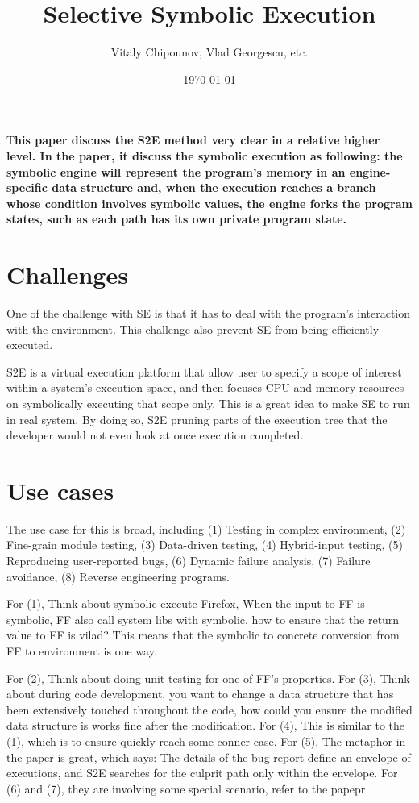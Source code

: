 \documentclass[	DIV=calc, paper=letter, fontsize=11pt,twocolumn]{scrartcl} %
\title{Selective Symbolic Execution}	%
\author{Vitaly Chipounov, Vlad Georgescu, etc. } %
\date{\today}
\newcommand{\initial}[1]{%
     \lettrine[lines=3,lhang=0.2,nindent=0em]{
     				\color{DarkGoldenrod}
     				{\textsf{#1}}}{}}
\begin{document}
\maketitle
\thispagestyle{fancy} 			%
\initial{T}\textbf{his paper discuss the S2E method very clear in a relative higher
level. In the paper, it discuss the symbolic execution as following: the
symbolic engine will represent the program’s memory in an engine-specific data
structure and, when the execution reaches a branch whose condition involves
symbolic values, the engine forks the program states, such as each path has
its own private program state.}

\section*{Challenges}

One of the challenge with SE is that it has to deal with the program’s
interaction with the environment. This challenge also prevent SE from being
efficiently executed.

S2E is a virtual execution platform that allow user to specify a scope of
interest within a system’s execution space, and then focuses CPU and memory
resources on symbolically executing that scope only. This is a great idea to
make SE to run in real system. By doing so, S2E pruning parts of the execution
tree that the developer would not even look at once execution completed.

\section*{Use cases}

The use case for this is broad, including (1) Testing in complex environment,
(2) Fine-grain module testing, (3) Data-driven testing, (4) Hybrid-input
testing, (5) Reproducing user-reported bugs, (6) Dynamic failure analysis, (7)
Failure avoidance, (8) Reverse engineering programs.

For (1), Think about symbolic execute Firefox, When the input to FF is
symbolic, FF also call system libs with symbolic, how to ensure that the
return value to FF is vilad? This means that the symbolic to concrete
conversion from FF to environment is one way.

For (2), Think about doing unit testing for one of FF’s properties.  For (3),
Think about during code development, you want to change a data structure that
has been extensively touched throughout the code, how could you ensure the
modified data structure is works fine after the modification.  For (4), This
is similar to the (1), which is to ensure quickly reach some conner case.  For
(5), The metaphor in the paper is great, which says: The details of the bug
report define an envelope of executions, and S2E searches for the culprit path
only within the envelope.  For (6) and (7), they are involving some special
scenario, refer to the papepr 
\end{document}
